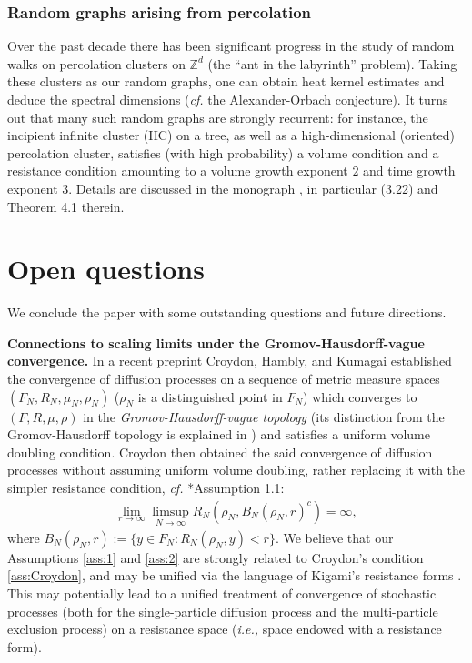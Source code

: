 \documentclass[11pt]{amsart}
\theoremstyle{plain}
\theoremstyle{definition}
\theoremstyle{remark}
\begin{document}
\subsubsection{Random graphs arising from percolation}

Over the past decade there has been significant progress in the study of random walks on percolation clusters on $\mathbb{Z}^d$ (the ``ant in the labyrinth'' problem). Taking these clusters as our random graphs, one can obtain heat kernel estimates and deduce the spectral dimensions (\emph{cf.\@} the Alexander-Orbach conjecture). It turns out that many such random graphs are strongly recurrent: for instance, the incipient infinite cluster (IIC) on a tree, as well as a high-dimensional (oriented) percolation cluster, satisfies (with high probability) a volume condition and a resistance condition amounting to a volume growth exponent $2$ and time growth exponent $3$. Details are discussed in the monograph \cite{KumagaiStFlour}, in particular (3.22) and Theorem 4.1 therein.  


\section{Open questions} \label{sec:open}

We conclude the paper with some outstanding questions and future directions.

\textbf{Connections to scaling limits under the Gromov-Hausdorff-vague convergence.} In a recent preprint \cite{CHK16} Croydon, Hambly, and Kumagai established the convergence of diffusion processes on a sequence of metric measure spaces $(F_N, R_N, \mu_N, \rho_N)$ ($\rho_N$ is a distinguished point in $F_N$) which converges to $(F,R,\mu,\rho)$ in the \emph{Gromov-Hausdorff-vague topology} (its distinction from the Gromov-Hausdorff topology is explained in \cite{ALW16}) and satisfies a uniform volume doubling condition. Croydon \cite{Croydon} then obtained the said convergence of diffusion processes without assuming uniform volume doubling, rather replacing it with the simpler resistance condition, \emph{cf.\@} \cite{Croydon}*{Assumption 1.1}:
\begin{align}
\label{ass:Croydon}
\lim_{r\to\infty} \limsup_{N\to\infty} R_N(\rho_N, B_N(\rho_N, r)^c) =\infty,
\end{align}
where $B_N(\rho_N, r) := \{y\in F_N: R_N(\rho_N,y)<r\}$.
We believe that our Assumptions \ref{ass:1} and \ref{ass:2} are strongly related to Croydon's condition \eqref{ass:Croydon}, and may be unified via the language of Kigami's resistance forms \cites{KigamiRF,KigamiMemoir}. This may potentially lead to a unified treatment of convergence of stochastic processes (both for the single-particle diffusion process and the multi-particle exclusion process) on a resistance space (\emph{i.e.,} space endowed with a resistance form).
\end{document}
